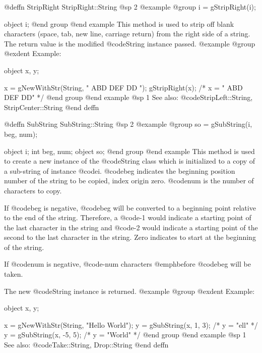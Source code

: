 @deffn {StripRight} StripRight::String
@sp 2
@example
@group
i = gStripRight(i);

object  i;
@end group
@end example
This method is used to strip off blank characters (space, tab, new line,
carriage return) from the right side of a string.  The return value is the
modified @code{String} instance passed.
@example
@group
@exdent Example:

object  x, y;

x = gNewWithStr(String, "    ABD  DEF  DD    ");
gStripRight(x);   /*  x = "    ABD  DEF  DD"    */
@end group
@end example
@sp 1
See also:  @code{StripLeft::String, StripCenter::String}
@end deffn























@deffn {SubString} SubString::String
@sp 2
@example
@group
so = gSubString(i, beg, num);

object  i;
int     beg, num;
object  so;
@end group
@end example
This method is used to create a new instance of the @code{String} class
which is initialized to a copy of a sub-string of instance @code{i}.
@code{beg} indicates the beginning position number of the string to be copied,
index origin zero.  @code{num} is the number of characters to copy.

If @code{beg} is negative, @code{beg} will be converted to a beginning point
relative to the end of the string.  Therefore, a @code{-1} would indicate
a starting point of the last character in the string and @code{-2} would
indicate a starting point of the second to the last character in the string.
Zero indicates to start at the beginning of the string.

If @code{num} is negative, @code{-num} characters @emph{before} @code{beg}
will be taken.

The new @code{String} instance is returned.
@example
@group
@exdent Example:

object  x, y;

x = gNewWithStr(String, "Hello World");
y = gSubString(x, 1, 3);   /*  y = "ell"    */
y = gSubString(x, -5, 5);  /*  y = "World"  */
@end group
@end example
@sp 1
See also:  @code{Take::String, Drop::String}
@end deffn











